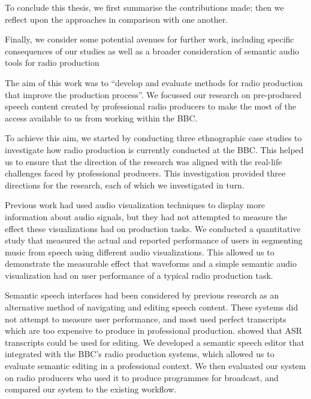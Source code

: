 To conclude this thesis, we first summarise the contributions made; then we reflect upon the approaches in comparison
with one another.

Finally, we consider some potential avenues for further work, including specific consequences of our studies as well as
a broader consideration of semantic audio tools for radio production





The aim of this work was to ``develop and evaluate methods for radio production that improve the production process''.
We focussed our research on pre-produced speech content created by professional radio producers to make the most of the
access available to us from working within the BBC.


To achieve this aim, we started by conducting three ethnographic case studies to investigate how radio production is
currently conducted at the BBC. This helped us to ensure that the direction of the research was aligned with the
real-life challenges faced by professional producers.  This investigation provided three directions for the research,
each of which we investigated in turn.

Previous work had used audio visualization techniques to display more information about audio signals, but they had not
attempted to measure the effect these visualizations had on production tasks.
We conducted a quantitative study that measured the actual and reported performance of users in segmenting music from
speech using different audio visualizations.
This allowed us to demonstrate the measurable effect that waveforms and a simple semantic audio visualization had on
user performance of a typical radio production task.

Semantic speech interfaces had been considered by previous research as an alternative method of navigating and
editing speech content.
These systems did not attempt to measure user performance, and most used perfect transcripts which are too expensive to
produce in professional production. \citet{Whittaker2004} showed that ASR transcripts could be used for editing.
We developed a semantic speech editor that integrated with the BBC's radio production systems, which allowed us to
evaluate semantic editing in a professional context.
We then evaluated our system on radio producers who used it to produce programmes for broadcast, and compared our
system to the existing workflow.

